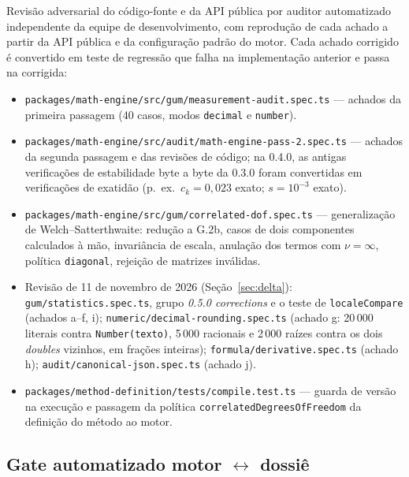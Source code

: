 \documentclass[11pt,a4paper]{article}
\newcommand{\auditedVersion}{0.3.0}
\newcommand{\reviewDate}{11 de novembro de 2026}
\begin{document}
Revisão adversarial do código-fonte e da API pública por auditor automatizado independente da equipe de desenvolvimento, com reprodução de cada achado a partir da API pública e da configuração padrão do motor. Cada achado corrigido é convertido em teste de regressão que falha na implementação anterior e passa na corrigida:

\begin{itemize}
  \item \texttt{packages/math-engine/src/gum/measurement-audit.spec.ts} --- achados da primeira passagem (40 casos, modos \texttt{decimal} e \texttt{number}).
  \item \texttt{packages/math-engine/src/audit/math-engine-pass-2.spec.ts} --- achados da segunda passagem e das revisões de código; na 0.4.0, as antigas verificações de estabilidade byte a byte da \auditedVersion{} foram convertidas em verificações de exatidão (p.~ex.\ \(c_k = 0{,}023\) exato; \(s = 10^{-3}\) exato).
  \item \texttt{packages/math-engine/src/gum/correlated-dof.spec.ts} --- generalização de Welch--Satterthwaite: redução a G.2b, casos de dois componentes calculados à mão, invariância de escala, anulação dos termos com \(\nu = \infty\), política \texttt{diagonal}, rejeição de matrizes inválidas.
  \item Revisão de \reviewDate{} (Seção~\ref{sec:delta}): \texttt{gum/statistics.spec.ts}, grupo \emph{0.5.0 corrections} e o teste de \texttt{localeCompare} (achados a--f, i); \texttt{numeric/decimal-rounding.spec.ts} (achado g: 20\,000 literais contra \texttt{Number(texto)}, 5\,000 racionais e 2\,000 raízes contra os dois \emph{doubles} vizinhos, em frações inteiras); \texttt{formula/derivative.spec.ts} (achado h); \texttt{audit/canonical-json.spec.ts} (achado j).
  \item \texttt{packages/method-definition/tests/compile.test.ts} --- guarda de versão na execução e passagem da política \texttt{correlatedDegreesOfFreedom} da definição do método ao motor.
\end{itemize}

\subsection{Gate automatizado motor \(\leftrightarrow\) dossiê}
\end{document}
